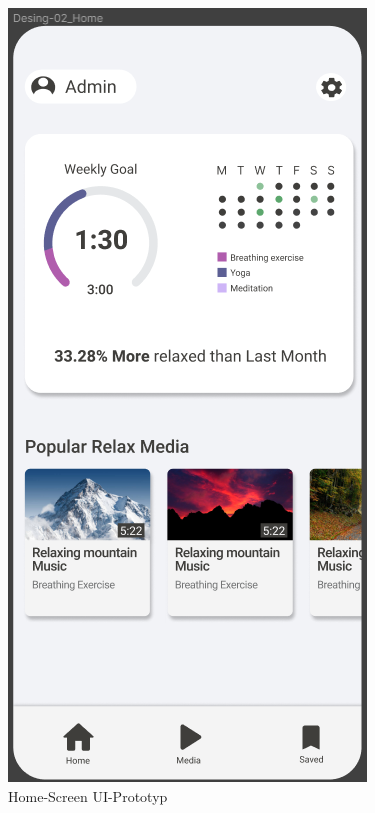 \begin{figure}[H]
    \begin{minipage}{0.5\textwidth}
        \centering
        \includegraphics[height=2\textwidth]{./pics/pHome.png}
        \caption{Home-Screen UI-Prototyp}

\end{minipage}
\end{figure}
